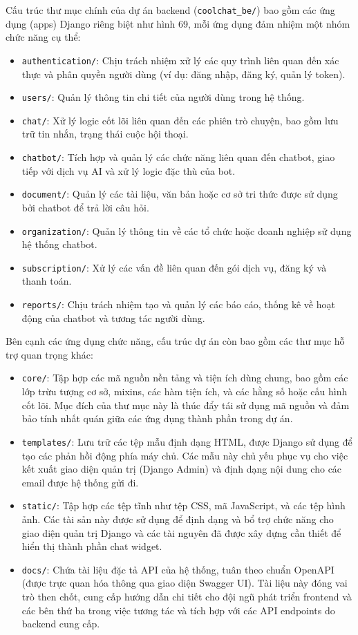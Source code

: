 Cấu trúc thư mục chính của dự án backend (\texttt{coolchat\_be/}) bao gồm các ứng dụng (apps) Django riêng biệt như hình 69, mỗi ứng dụng đảm nhiệm một nhóm chức năng cụ thể:
\begin{itemize}
    \item \texttt{authentication/}: Chịu trách nhiệm xử lý các quy trình liên quan đến xác thực và phân quyền người dùng (ví dụ: đăng nhập, đăng ký, quản lý token).
    \item \texttt{users/}: Quản lý thông tin chi tiết của người dùng trong hệ thống.
    \item \texttt{chat/}: Xử lý logic cốt lõi liên quan đến các phiên trò chuyện, bao gồm lưu trữ tin nhắn, trạng thái cuộc hội thoại.
    \item \texttt{chatbot/}: Tích hợp và quản lý các chức năng liên quan đến chatbot, giao tiếp với dịch vụ AI và xử lý logic đặc thù của bot.
    \item \texttt{document/}: Quản lý các tài liệu, văn bản hoặc cơ sở tri thức được sử dụng bởi chatbot để trả lời câu hỏi.
    \item \texttt{organization/}: Quản lý thông tin về các tổ chức hoặc doanh nghiệp sử dụng hệ thống chatbot.
    \item \texttt{subscription/}: Xử lý các vấn đề liên quan đến gói dịch vụ, đăng ký và thanh toán.
    \item \texttt{reports/}: Chịu trách nhiệm tạo và quản lý các báo cáo, thống kê về hoạt động của chatbot và tương tác người dùng.
\end{itemize}

Bên cạnh các ứng dụng chức năng, cấu trúc dự án còn bao gồm các thư mục hỗ trợ quan trọng khác:
\begin{itemize}
    \item \texttt{core/}: Tập hợp các mã nguồn nền tảng và tiện ích dùng chung, bao gồm các lớp trừu tượng cơ sở, mixins, các hàm tiện ích, và các hằng số hoặc cấu hình cốt lõi. Mục đích của thư mục này là thúc đẩy tái sử dụng mã nguồn và đảm bảo tính nhất quán giữa các ứng dụng thành phần trong dự án.
    \item \texttt{templates/}: Lưu trữ các tệp mẫu định dạng HTML, được Django sử dụng để tạo các phản hồi động phía máy chủ. Các mẫu này chủ yếu phục vụ cho việc kết xuất giao diện quản trị (Django Admin) và định dạng nội dung cho các email được hệ thống gửi đi.
    \item \texttt{static/}: Tập hợp các tệp tĩnh như tệp CSS, mã JavaScript, và các tệp hình ảnh. Các tài sản này được sử dụng để định dạng và bổ trợ chức năng cho giao diện quản trị Django và các tài nguyên đã được xây dựng cần thiết để hiển thị thành phần chat widget.
    \item \texttt{docs/}: Chứa tài liệu đặc tả API của hệ thống, tuân theo chuẩn OpenAPI (được trực quan hóa thông qua giao diện Swagger UI). Tài liệu này đóng vai trò then chốt, cung cấp hướng dẫn chi tiết cho đội ngũ phát triển frontend và các bên thứ ba trong việc tương tác và tích hợp với các API endpoints do backend cung cấp.
\end{itemize}

